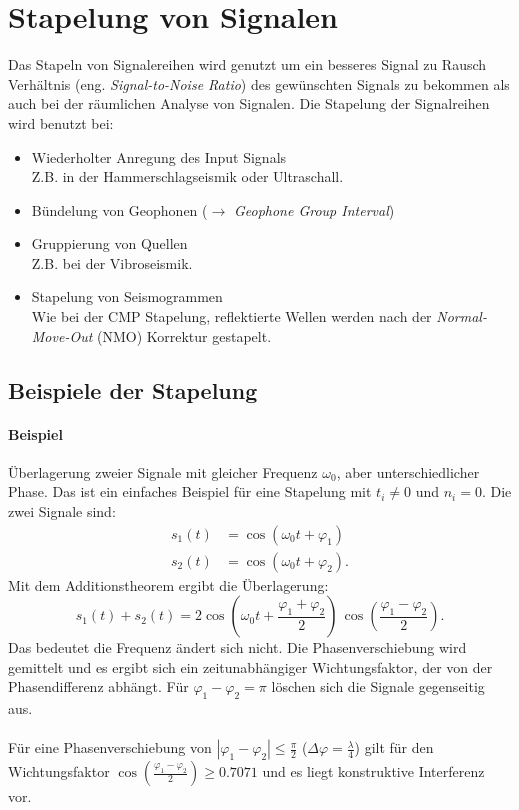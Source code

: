 \chapter{Stapelung von Signalen}
Das Stapeln von Signalereihen wird genutzt um ein besseres Signal zu Rausch Verhältnis (eng. \textsl{Signal-to-Noise Ratio}) des gewünschten Signals zu bekommen als auch bei der räumlichen Analyse von Signalen.
Die Stapelung der Signalreihen wird benutzt bei:
\begin{itemize}
\item Wiederholter Anregung des Input Signals\\
Z.B. in der Hammerschlagseismik oder Ultraschall.
\item Bündelung von Geophonen ($\rightarrow$ \textit{Geophone Group Interval})
\item Gruppierung von Quellen\\
Z.B. bei der Vibroseismik.
\item Stapelung von Seismogrammen\\
Wie bei der CMP Stapelung, reflektierte Wellen werden nach der \textit{Normal-Move-Out} (NMO) Korrektur gestapelt.
\end{itemize}

\section{Beispiele der Stapelung}
\subsubsection*{Beispiel}
Überlagerung zweier Signale mit gleicher Frequenz $\omega_0$, aber unterschiedlicher Phase.  Das ist ein einfaches Beispiel für eine Stapelung mit $t_i\not= 0$ und $n_i=0$. Die zwei Signale sind:
\begin{align*}
s_1(t) & =\cos(\omega_0 t+\varphi_1)\\
s_2(t) & =\cos(\omega_0 t+\varphi_2).
\end{align*}
Mit dem Additionstheorem ergibt die Überlagerung:
\begin{equation}
s_1(t)+s_2(t)=2 \cos \left(\omega_0 t + \frac {\varphi_1 + \varphi_2}{2}\right)\, \cos\left(\frac {\varphi_1 - \varphi_2}{2}\right).
\end{equation}
Das bedeutet die Frequenz ändert sich nicht. Die Phasenverschiebung wird gemittelt und es ergibt sich ein zeitunabhängiger Wichtungsfaktor, der von der Phasendifferenz abhängt. Für $\varphi_1-\varphi_2= \pi $ löschen sich die Signale gegenseitig aus.\\\\
Für eine Phasenverschiebung von $|\varphi_1-\varphi_2|\le \frac{\pi}{2}$ ($\Delta\varphi = \frac{\lambda}{4}$) gilt für den Wichtungsfaktor $\cos \left(\frac{\varphi_1-\varphi_2}{2} \right)\ge 0.7071$ und es liegt konstruktive Interferenz vor.\\ 

